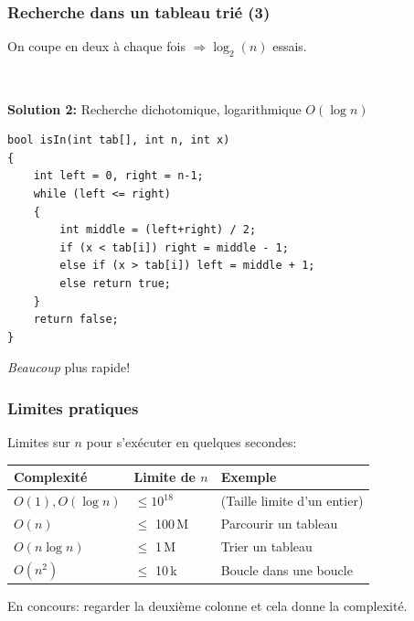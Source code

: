 \documentclass[12pt]{beamer}
\begin{document}
\begin{frame}[fragile]
\frametitle{Recherche dans un tableau trié (3)}
On coupe en deux à chaque fois $\Rightarrow \log_2(n)$ essais.

~

\textbf{Solution 2:} Recherche dichotomique, logarithmique $O(\log n)$
\begin{lstlisting}
bool isIn(int tab[], int n, int x)
{
    int left = 0, right = n-1;
    while (left <= right)
    {
        int middle = (left+right) / 2;
        if (x < tab[i]) right = middle - 1;
        else if (x > tab[i]) left = middle + 1;
        else return true;
    }
    return false;
}
\end{lstlisting}
\emph{Beaucoup} plus rapide!
\end{frame}

\begin{frame}
\frametitle{Limites pratiques}
Limites sur $n$ pour s'exécuter en quelques secondes:
\begin{center}
\begin{tabu}{lll}
    \toprule
    Complexité & Limite de $n$ & Exemple \\
    \midrule
    $O(1), O(\log n)$ & $\leq 10^{18}$ & (Taille limite d'un entier) \\
    $O(n)$ & $\leq$ 100\,M & Parcourir un tableau \\
    $O(n\log n)$ & $\leq$ 1\,M & Trier un tableau \\
    $O(n^2)$ & $\leq$ 10\,k & Boucle dans une boucle \\
    \bottomrule
\end{tabu}
\end{center}
En concours: regarder la deuxième colonne et cela donne la complexité.
\end{frame}
\end{document}
